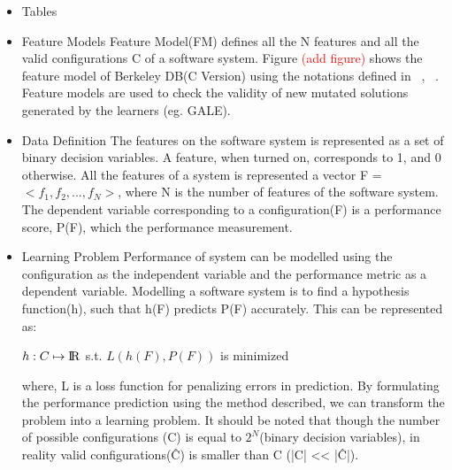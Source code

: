\documentclass{sig-alternative}
\newcommand{\bi}{\begin{itemize}[leftmargin=0.4cm]}
\newcommand{\ei}{\end{itemize}}
\begin{document}
\bi
    \item{Tables}
    \item{Feature Models}
    Feature Model(FM) defines all the N features and all the valid configurations C of a software system. Figure \textcolor{red}{(add figure)} shows the feature model of Berkeley DB(C Version) using the notations defined in ~\cite{kang1990feature}, ~\cite{guo2012consistency}. Feature models are used to check the validity of new mutated solutions generated by the learners (eg. GALE).
    \item{Data Definition}
    The features on the software system is represented as a set of binary decision variables. A feature, when turned on, corresponds to 1, and 0 otherwise. All the features of a system is represented a vector F = $<f_1, f_2, ...,f_N>$, where N is the number of features of the software system. The dependent variable corresponding to a configuration(F) is a performance score, P(F), which the performance measurement.
    \item{Learning Problem}
    Performance of system can be modelled using the configuration as the independent variable and the performance metric as a dependent variable. Modelling a software system is to find a hypothesis function(h), such that h(F) predicts P(F) accurately. This can be represented as:\\
\begin{center}
    $ h: C \mapsto \rm I\!R$ s.t. $L(h(F), P(F))$ is minimized\\
\end{center}

where, L is a loss function for penalizing errors in prediction. By formulating the performance prediction using the method described, we can transform the problem into a learning problem. 
    It should be noted that though the number of possible configurations (C) is equal to $2^N$(binary decision variables), in reality valid configurations(\^{C}) is smaller than C (|C| << |\^C|). 
    
\ei
\end{document}
